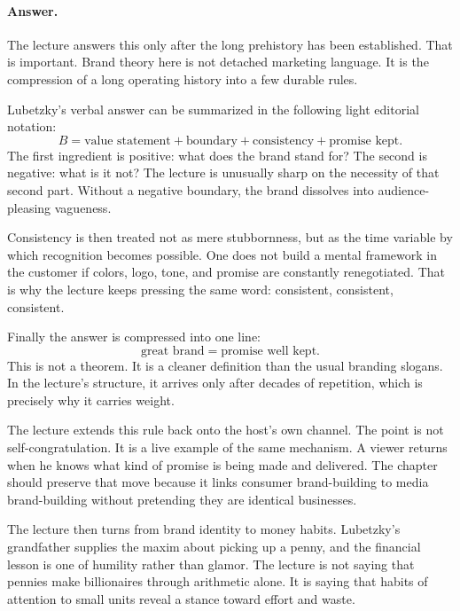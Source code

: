 \paragraph{Answer.} The lecture answers this only after the long prehistory has been established. That is important. Brand theory here is not detached marketing language. It is the compression of a long operating history into a few durable rules.

Lubetzky's verbal answer can be summarized in the following light editorial notation:
\begin{equation}
B = \text{value statement} + \text{boundary} + \text{consistency} + \text{promise kept}.
\end{equation}
The first ingredient is positive: what does the brand stand for? The second is negative: what is it not? The lecture is unusually sharp on the necessity of that second part. Without a negative boundary, the brand dissolves into audience-pleasing vagueness.

Consistency is then treated not as mere stubbornness, but as the time variable by which recognition becomes possible. One does not build a mental framework in the customer if colors, logo, tone, and promise are constantly renegotiated. That is why the lecture keeps pressing the same word: consistent, consistent, consistent.

Finally the answer is compressed into one line:
\begin{equation}
\text{great brand} = \text{promise well kept}.
\end{equation}
This is not a theorem. It is a cleaner definition than the usual branding slogans. In the lecture's structure, it arrives only after decades of repetition, which is precisely why it carries weight.

The lecture extends this rule back onto the host's own channel. The point is not self-congratulation. It is a live example of the same mechanism. A viewer returns when he knows what kind of promise is being made and delivered. The chapter should preserve that move because it links consumer brand-building to media brand-building without pretending they are identical businesses.

The lecture then turns from brand identity to money habits. Lubetzky's grandfather supplies the maxim about picking up a penny, and the financial lesson is one of humility rather than glamor. The lecture is not saying that pennies make billionaires through arithmetic alone. It is saying that habits of attention to small units reveal a stance toward effort and waste.

